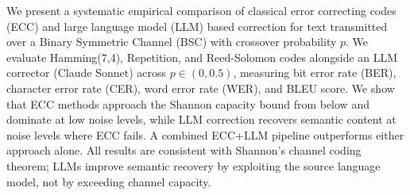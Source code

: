 We present a systematic empirical comparison of classical error correcting codes
(ECC) and large language model (LLM) based correction for text transmitted over
a Binary Symmetric Channel (BSC) with crossover probability $p$.  We evaluate
Hamming(7,4), Repetition, and Reed-Solomon codes alongside an LLM corrector
(Claude Sonnet) across $p \in (0, 0.5)$, measuring bit error rate (BER),
character error rate (CER), word error rate (WER), and BLEU score.  We show
that ECC methods approach the Shannon capacity bound from below and dominate at
low noise levels, while LLM correction recovers semantic content at noise levels
where ECC fails.  A combined ECC+LLM pipeline outperforms either approach
alone.  All results are consistent with Shannon's channel coding theorem; LLMs
improve semantic recovery by exploiting the source language model, not by
exceeding channel capacity.
